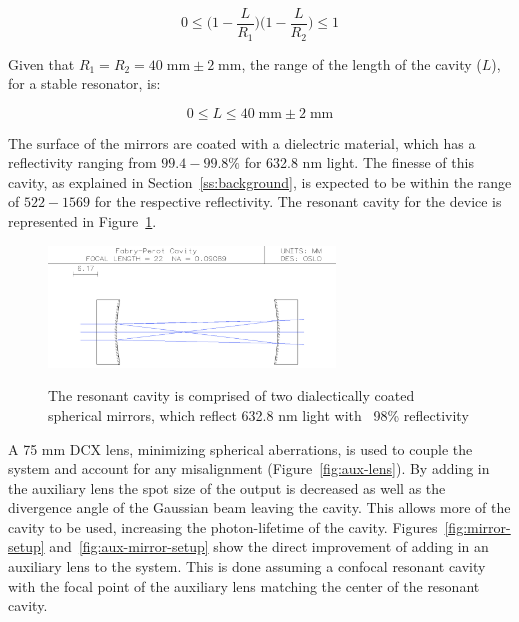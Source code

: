 \documentclass[12pt,journal]{IEEEtran}
\begin{document}
\begin{equation}
0 \leq \Big(1-\frac{L}{R_1}\Big)\Big(1-\frac{L}{R_2}\Big) \leq 1
\label{eq:unsolved_stability}
\end{equation}

Given that $R_1 = R_2 = 40\;\text{mm} \pm2\;\text{mm}$, the range of the length of the cavity ($L$), for a stable resonator, is:

\begin{equation}
0 \leq L \leq 40\;\text{mm} \pm 2\;\text{mm}
\label{eq:cavity_stability}
\end{equation}

The surface of the mirrors are coated with a dielectric material, which has a reflectivity ranging from $99.4-99.8\%$ for 632.8 nm light. The finesse of this cavity, as explained in Section~\ref{ss:background}, is expected to be within the range of $522 - 1569$ for the respective reflectivity.  The resonant cavity for the device is represented in Figure~\ref{fig:resonant-cavity}. 

\begin{figure}[h!]
  \centering
	\includegraphics[width=3in]{./cavity/resonant_cavity.png}\\
	\caption[Resonant Cavity Setup]{The resonant cavity is comprised of two dialectically coated spherical mirrors, which reflect 632.8 nm light with ~98\% reflectivity}
	\label{fig:resonant-cavity}
\end{figure}

A 75 mm DCX lens, minimizing spherical aberrations, is used to couple the system and account for any misalignment (Figure~\ref{fig:aux-lens}). By adding in the auxiliary lens the spot size of the output is decreased as well as the divergence angle of the Gaussian beam leaving the cavity. This allows more of the cavity to be used, increasing the photon-lifetime of the cavity. Figures~\ref{fig:mirror-setup} and~\ref{fig:aux-mirror-setup} show the direct improvement of adding in an auxiliary lens to the system. This is done assuming a confocal resonant cavity with the focal point of the auxiliary lens matching the center of the resonant cavity.
\end{document}
